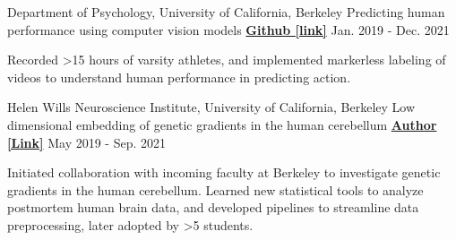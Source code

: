 \begin{cventries}
  \cventry
   	{Department of Psychology, University of California, Berkeley}
    {Predicting human performance using computer vision models} %
    {\href{https://github.com/maedbhk/action_prediction}{\textbf{Github [link]}}}
    {Jan. 2019 - Dec. 2021} %
    {
      \begin{cvitems} %
      	\item {Recorded >15 hours of varsity athletes, and implemented markerless labeling of videos to understand human performance in predicting action.}
      \end{cvitems}
    }
    
  \cventry
    {Helen Wills Neuroscience Institute, University of California, Berkeley} %
    {Low dimensional embedding of genetic gradients in the human cerebellum} %
    {\href{https://papers.ssrn.com/sol3/papers.cfm?abstract_id=3797269}{\textbf{Author [Link]}}}
    {May 2019 - Sep. 2021}
    {
      \begin{cvitems} %
      	\item {Initiated collaboration with incoming faculty at Berkeley to investigate genetic gradients in the human cerebellum. Learned new statistical tools to analyze postmortem human brain data, and developed pipelines to streamline data preprocessing, later adopted by >5 students.}
      \end{cvitems}
    }
  
\end{cventries}



